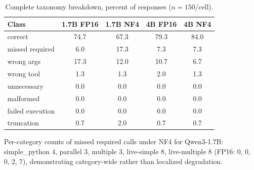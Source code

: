 \documentclass{article}
\begin{document}
\begin{table}[h]
\caption{Complete taxonomy breakdown, percent of responses ($n=150$/cell).}
\centering
\small
\begin{tabular}{lcccc}
\toprule
Class & 1.7B FP16 & 1.7B NF4 & 4B FP16 & 4B NF4 \\
\midrule
correct            & 74.7 & 67.3 & 79.3 & 84.0 \\
missed required    & 6.0  & 17.3 & 7.3  & 7.3  \\
wrong args         & 17.3 & 12.0 & 10.7 & 6.7  \\
wrong tool         & 1.3  & 1.3  & 2.0  & 1.3  \\
unnecessary        & 0.0  & 0.0  & 0.0  & 0.0  \\
malformed          & 0.0  & 0.0  & 0.0  & 0.0  \\
failed execution   & 0.0  & 0.0  & 0.0  & 0.0  \\
truncation         & 0.7  & 2.0  & 0.7  & 0.7  \\
\bottomrule
\end{tabular}
\end{table}

Per-category counts of missed required calls under NF4 for Qwen3-1.7B:
simple\_python 4, parallel 3, multiple 3, live-simple 8, live-multiple 8
(FP16: 0, 0, 0, 2, 7), demonstrating category-wide rather than localized
degradation.
\end{document}
